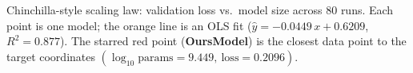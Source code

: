 \caption{Chinchilla-style scaling law: validation loss vs.\ model size across 80 runs.
Each point is one model; the orange line is an OLS fit
($\hat{y} = -0.0449\,x + 0.6209$, $R^{2}=0.877$).
The starred red point (\textbf{OursModel}) is the closest data point to the target
coordinates $(\log_{10}\text{params}=9.449,\ \text{loss}=0.2096)$.}
